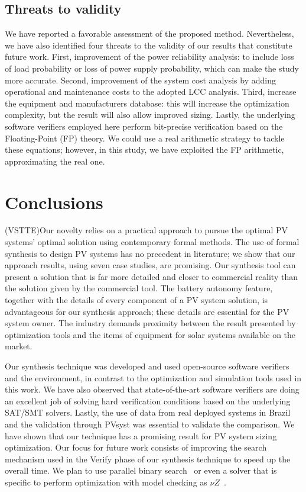 \documentclass[10pt,journal,compsoc]{IEEEtran}
\begin{document}
\subsection{Threats to validity} 

We have reported a favorable assessment of the proposed method. Nevertheless, we have also identified four threats to the validity of our results that constitute future work. First, improvement of the power reliability analysis: to include loss of load probability or loss of power supply probability, which can make the study more accurate. Second, improvement of the system cost analysis by adding operational and maintenance costs to the adopted LCC analysis. Third, increase the equipment and manufacturers database: this will increase the optimization complexity, but the result will also allow improved sizing. Lastly, the underlying software verifiers employed here perform bit-precise verification based on the Floating-Point (FP) theory. We could use a real arithmetic strategy to tackle these equations; however, in this study, we have exploited the FP arithmetic, approximating the real one. 

\section{Conclusions} 

(VSTTE)Our novelty relies on a practical approach to pursue the optimal PV systems' optimal solution using contemporary formal methods. The use of formal synthesis to design PV systems has no precedent in literature; we show that our approach results, using seven case studies, are promising. Our synthesis tool can present a solution that is far more detailed and closer to commercial reality than the solution given by the commercial tool. The battery autonomy feature, together with the details of every component of a PV system solution, is advantageous for our synthesis approach; these details are essential for the PV system owner. The industry demands proximity between the result presented by optimization tools and the items of equipment for solar systems available on the market. 

Our synthesis technique was developed and used open-source software verifiers and the environment, in contrast to the optimization and simulation tools used in this work. We have also observed that state-of-the-art software verifiers are doing an excellent job of solving hard verification conditions based on the underlying SAT/SMT solvers. Lastly, the use of data from real deployed systems in Brazil and the validation through PVsyst was essential to validate the comparison. We have shown that our technique has a promising result for PV system sizing optimization. Our focus for future work consists of improving the search mechanism used in the {\sc Verify} phase of our synthesis technique to speed up the overall time. We plan to use parallel binary search~\cite{TrindadeDJISC17} or even a solver that is specific to perform optimization with model checking as $\nu Z$~\cite{BjornerPF15}.
\end{document}
